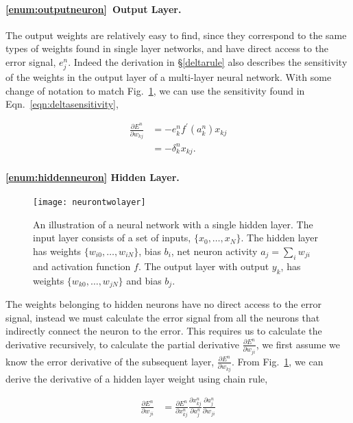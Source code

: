 \documentclass[thesis]{subfiles}
\begin{document}
\paragraph{\ref{enum:outputneuron}~Output Layer.}
The output weights are relatively easy to find, since they correspond to the same types of weights found in single layer networks, and have direct access to the error signal, \ie $e^n_j$. Indeed the derivation in \S\ref{deltarule} also describes the sensitivity of the weights in the output layer of a multi-layer neural network. With some change of notation to match Fig.~\ref{fig:neurontwolayer}, we can use the sensitivity found in Eqn.~\ref{eqn:deltasensitivity},

\begin{equation}
\begin{aligned}
    \frac{\partial E^n}{\partial w_{kj}} &= - e^n_k  f^\prime\left( a^n_k \right) x_{kj}\\
    &= -\delta^n_k x_{kj}.
\end{aligned}
\end{equation}
\paragraph{\ref{enum:hiddenneuron} Hidden Layer.}
\begin{figure}[tbp]
\centering
\texttt{[image: neurontwolayer]}
\caption[An illustration of a neural network with a single hidden layer]{An illustration of a neural network with a single hidden layer. The input layer consists of a set of inputs, $\{x_{0}, \ldots, x_{N}\}$. The hidden layer has weights $\{w_{i0}, \ldots, w_{iN}\}$, bias $b_i$, net neuron activity $a_j = \sum_i w_{ji}$ and activation function $f$. The output layer with output $y_k$, has weights $\{w_{k0}, \ldots, w_{jN}\}$ and bias $b_j$.}
\label{fig:neurontwolayer}
\end{figure}
The weights belonging to hidden neurons have no direct access to the error signal, instead we must calculate the error signal from all the neurons that indirectly connect the neuron to the error. This requires us to calculate the derivative recursively, \ie to calculate the partial derivative $\frac{\partial E^n}{\partial w_{ji}}$, we first assume we know the error derivative of the subsequent layer, $\frac{\partial E^n}{\partial w_{kj}}$. From Fig.~\ref{fig:neurontwolayer}, we can derive the derivative of a hidden layer weight using chain rule,

\begin{equation}
\begin{aligned}
    \frac{\partial E^n}{\partial w_{ji}} &= \frac{\partial E^n}{\partial x^n_{kj}} \frac{\partial x^n_{kj}}{\partial a^n_{j}} \frac{\partial a^n_{j}}{\partial w_{ji}}
\end{aligned}
\end{equation}
\end{document}
